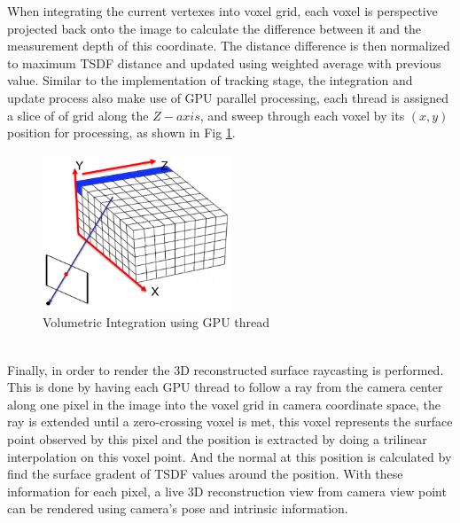 \documentclass[12pt,twoside]{article}
\begin{document}
When integrating the current vertexes into voxel grid, each voxel is perspective projected back onto the image to calculate the difference between it and the measurement depth of this coordinate. The distance difference is then normalized to maximum TSDF distance and updated using weighted average with   previous value. Similar to the implementation of tracking stage, the integration and update process also make use of GPU parallel processing, each thread is assigned a slice of of grid along the $Z-axis$, and sweep through each voxel by its $(x,y)$ position for processing, as shown in Fig \ref{fig:kin}.\\
\begin{figure}[h]
    \centering
    \includegraphics[width=0.5\textwidth]{figures/kin}
    \caption{Volumetric Integration using GPU thread \cite{1_yin_2016}}
    \label{fig:kin}
\end{figure}\\
Finally, in order to render the 3D reconstructed surface raycasting is performed. This is done by having each GPU thread to follow a ray from the camera center along one pixel in the image into the voxel grid in camera coordinate space, the ray is extended until a zero-crossing voxel is met, this voxel represents the surface point observed by this pixel and the position is extracted by doing a trilinear interpolation on this voxel point. And the normal at this position is calculated by find the surface gradent of TSDF values around the position. With these information for each pixel, a live 3D reconstruction view from camera view point can be rendered using camera's pose and intrinsic information.
\end{document}
